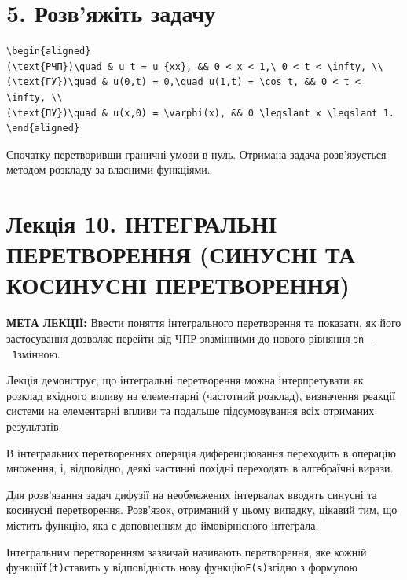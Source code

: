 \documentclass[
  ukrainian,
]{article}
\begin{document}
\section{5. Розв'яжіть
задачу}\label{ux440ux43eux437ux432ux44fux436ux456ux442ux44c-ux437ux430ux434ux430ux447ux443-1}

\begin{verbatim}
\begin{aligned}
(\text{РЧП})\quad & u_t = u_{xx}, && 0 < x < 1,\ 0 < t < \infty, \\
(\text{ГУ})\quad & u(0,t) = 0,\quad u(1,t) = \cos t, && 0 < t < \infty, \\
(\text{ПУ})\quad & u(x,0) = \varphi(x), && 0 \leqslant x \leqslant 1.
\end{aligned}
\end{verbatim}

Спочатку перетворивши граничні умови в нуль. Отримана задача
розв'язується методом розкладу за власними функціями.

\section{Лекція 10. ІНТЕГРАЛЬНІ ПЕРЕТВОРЕННЯ (СИНУСНІ ТА КОСИНУСНІ
ПЕРЕТВОРЕННЯ)}\label{ux43bux435ux43aux446ux456ux44f-10.-ux456ux43dux442ux435ux433ux440ux430ux43bux44cux43dux456-ux43fux435ux440ux435ux442ux432ux43eux440ux435ux43dux43dux44f-ux441ux438ux43dux443ux441ux43dux456-ux442ux430-ux43aux43eux441ux438ux43dux443ux441ux43dux456-ux43fux435ux440ux435ux442ux432ux43eux440ux435ux43dux43dux44f}

\textbf{МЕТА ЛЕКЦІЇ:} Ввести поняття інтегрального перетворення та
показати, як його застосування дозволяє перейти від ЧПР
з\texttt{n}змінними до нового рівняння з\texttt{n\ -\ 1}змінною.

Лекція демонструє, що інтегральні перетворення можна інтерпретувати як
розклад вхідного впливу на елементарні (частотний розклад), визначення
реакції системи на елементарні впливи та подальше підсумовування всіх
отриманих результатів.

В інтегральних перетвореннях операція диференціювання переходить в
операцію множення, і, відповідно, деякі частинні похідні переходять в
алгебраїчні вирази.

Для розв'язання задач дифузії на необмежених інтервалах вводять синусні
та косинусні перетворення. Розв'язок, отриманий у цьому випадку, цікавий
тим, що містить функцію, яка є доповненням до ймовірнісного інтеграла.

Інтегральним перетворенням зазвичай називають перетворення, яке кожній
функції\texttt{f(t)}ставить у відповідність нову
функцію\texttt{F(s)}згідно з формулою
\end{document}
